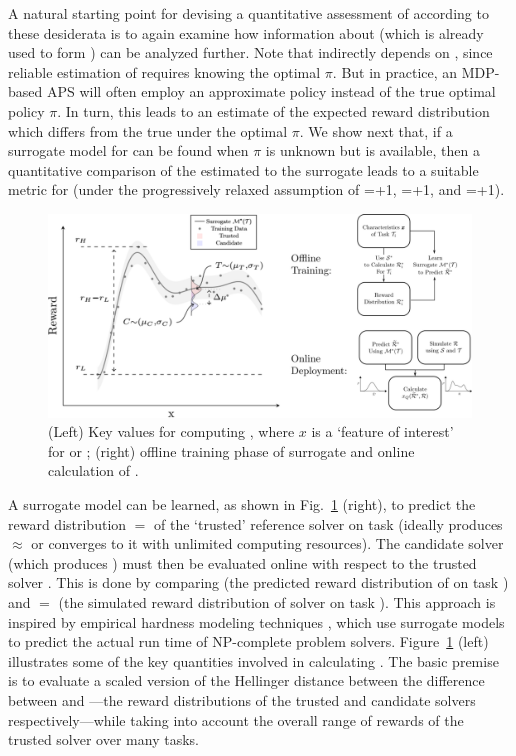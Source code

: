 A natural starting point for devising a quantitative assessment of \xQ{} according to these desiderata is to again examine how information about \pri{} (which is already used to form \xO{}) can be analyzed further. 
Note that \xO{} indirectly depends on \xQ{}, since reliable estimation of \ppiri{} requires knowing the optimal $\pi$. But in practice, an MDP-based APS will often employ an approximate policy \tpi{} instead of the true optimal policy $\pi$. In turn, this leads to an estimate \ppitri{} of the expected reward distribution which differs from the true \ppiri{} under the optimal $\pi$. We show next that, if a surrogate model for \ppiri{} can be found when $\pi$ is unknown but \tpi{} is available, then a quantitative comparison of the estimated \ppitri{} to the surrogate \ppiri{} leads to a suitable metric for \xQ{} (under the progressively relaxed assumption of \xM{}=+1, \xP{}=+1, and \xI{}=+1). 
    \begin{figure}[tb]
        \centering
        \includegraphics[width=0.79\linewidth]{Figures/SQ_AllCombined.png}
        \caption{(Left) Key values for computing \xQ, where $x$ is a `feature of interest' for \task or \solve; (right) offline training phase of surrogate \surrogate{} and online calculation of \xQ{}. }
        \label{fig:sq_v3}
        \vspace{-0.2cm}
    \end{figure}

A surrogate model \surrogate{} can be learned, as shown in Fig.~\ref{fig:sq_v3} (right), to predict the reward distribution $ $\rwdstarapprox$=$\ppisri$ $ of the `trusted' reference solver \solvestar{} on task \task{} (ideally \solvestar{} produces $ $\policystar$ \approx $\policy$ $ or converges to it with unlimited computing resources). The candidate solver \solve{} (which produces \policyc) must then be evaluated online with respect to the trusted solver \solvestar{}. This is done by comparing \rwdstarapprox{} (the predicted reward distribution of \solvestar{} on task \task) and $ $\rwd$= $\ppicri$ $ (the simulated reward distribution of solver \solve{} on task \task). 
This approach is inspired by empirical hardness modeling techniques \cite{Leyton-Brown2009-yr}, which use surrogate models to predict the actual run time of NP-complete problem solvers. 
Figure~\ref{fig:sq_v3} (left) illustrates some of the key quantities involved in calculating \xQ{}. The basic premise is to evaluate a scaled version of the Hellinger distance between the difference between \rwdstar{} and \rwd{}---the reward distributions of the trusted and candidate solvers respectively---while taking into account the overall range of rewards of the trusted solver over many tasks. 

